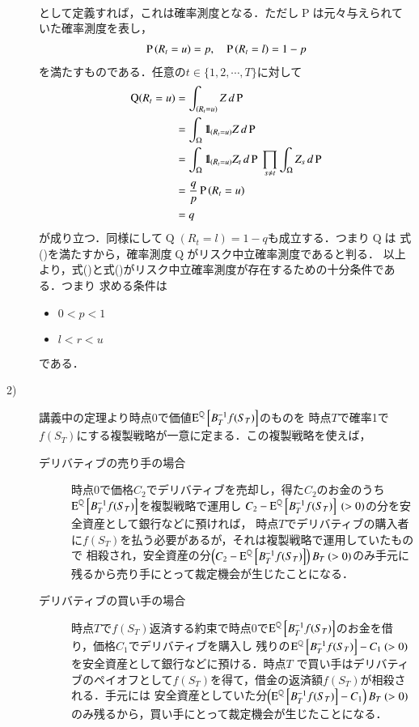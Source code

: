 \begin{description}
\begin{align}
	\end{align}
	として定義すれば，これは確率測度となる．ただし$\operatorname{P}$は元々与えられていた確率測度を表し，
	\begin{align}
		\prob{R_t = u} = p, \quad \prob{R_t = l} = 1-p
	\end{align}
	を満たすものである．任意の$t \in \{1,2,\cdots,T\}$に対して
	\begin{align}
		\operatorname{Q}(R_t = u) &= \int_{(R_t=u)} Z\, d\operatorname{P} \\
		&= \int_{\Omega} \defunc_{(R_t = u)} Z\, d\operatorname{P} \\
		&= \int_{\Omega} \defunc_{(R_t = u)} Z_t\, d\operatorname{P}\ \prod_{s \neq t} \int_{\Omega} Z_s\, d\operatorname{P} \\
		&= \frac{q}{p}\prob{R_t = u} \\
		&= q
	\end{align}
	が成り立つ．同様にして$\operatorname{Q}(R_t = l) = 1-q$も成立する．つまり$\operatorname{Q}$は
	式()を満たすから，確率測度$\operatorname{Q}$がリスク中立確率測度であると判る．
	以上より，式()と式()がリスク中立確率測度が存在するための十分条件である．つまり
	求める条件は
	\begin{itemize}
		\item $0 < p < 1$
		\item $l < r < u$
	\end{itemize}
	である．

\item[2)] 講義中の定理より時点$0$で価値$\Exp{B_T^{-1}f(S_T)}{}{\mathbb{Q}}$のものを
	時点$T$で確率1で$f(S_T)$にする複製戦略が一意に定まる．この複製戦略を使えば，
	\begin{description}
		\item[デリバティブの売り手の場合] 
			時点$0$で価格$C_2$でデリバティブを売却し，得た$C_2$のお金のうち$\Exp{B_T^{-1}f(S_T)}{}{\mathbb{Q}}$を複製戦略で運用し
			$C_2 - \Exp{B_T^{-1}f(S_T)}{}{\mathbb{Q}}\ (> 0)$の分を安全資産として銀行などに預ければ，
			時点$T$でデリバティブの購入者に$f(S_T)$を払う必要があるが，それは複製戦略で運用していたもので
			相殺され，安全資産の分$\left(C_2 - \Exp{B_T^{-1}f(S_T)}{}{\mathbb{Q}}\right)B_T\ (> 0)$のみ手元に残るから売り手にとって裁定機会が生じたことになる．
			
		\item[デリバティブの買い手の場合] 
			時点$T$で$f(S_T)$返済する約束で時点$0$で$\Exp{B_T^{-1}f(S_T)}{}{\mathbb{Q}}$のお金を借り，価格$C_1$でデリバティブを購入し
			残りの$\Exp{B_T^{-1}f(S_T)}{}{\mathbb{Q}} - C_1\ (>0)$を安全資産として銀行などに預ける．時点$T$
			で買い手はデリバティブのペイオフとして$f(S_T)$を得て，借金の返済額$f(S_T)$が相殺される．手元には
			安全資産としていた分$\left(\Exp{B_T^{-1}f(S_T)}{}{\mathbb{Q}} - C_1\right)B_T\ (> 0)$のみ残るから，買い手にとって裁定機会が生じたことになる．
	\end{description}
\end{description}


